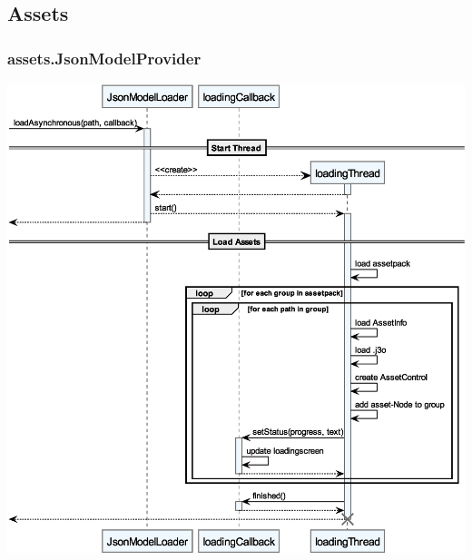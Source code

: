 \subsection{Assets}

\subsubsection{assets.JsonModelProvider}
\begin{center}
    \includegraphics[width=\linewidth]{Assets/Assets_loadAsynchronous.eps}
\end{center}